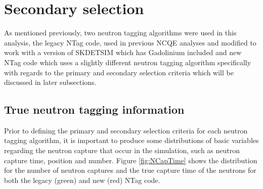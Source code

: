 \section{Secondary selection}

As mentioned previously, two neutron tagging algorithms were used in this analysis, the legacy NTag code, used in previous NCQE analyses and modified to work with a version of SKDETSIM which has Gadolinium included and new NTag code which uses a slightly different neutron tagging algorithm specifically with regards to the primary and secondary selection criteria which will be discussed in later subsections.



\subsection{True neutron tagging information}

Prior to defining the primary and secondary selection criteria for each neutron tagging algorithm, it is important to produce some distributions of basic variables regarding the neutron capture that occur in the simulation, such as neutron capture time, position and number. Figure \ref{fig:NCapTime} shows the distribution for the number of neutron captures and the true capture time of the neutrons for both the legacy (green) and new (red) NTag code.  

